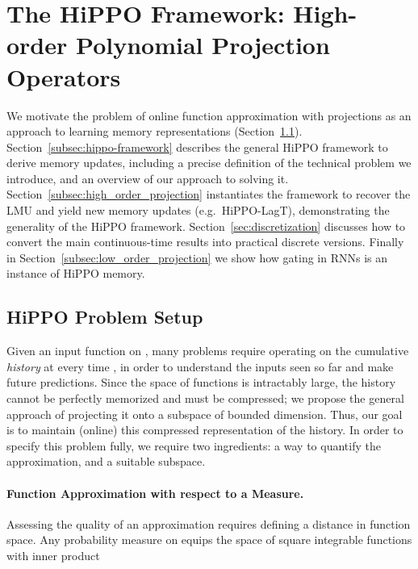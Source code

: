 \documentclass{article}
\begin{document}
 

\section{The HiPPO Framework: High-order Polynomial Projection Operators}
\label{sec:framework}

We motivate the problem of online function approximation with projections
as an approach to learning memory representations
(Section~\ref{subsec:hippo-setup}).
Section~\ref{subsec:hippo-framework} describes the general
HiPPO framework to derive memory updates, including a precise definition of the technical problem 
we introduce, and an overview of our approach to solving it.
Section~\ref{subsec:high_order_projection} instantiates the framework to recover
the LMU and yield new memory updates (e.g.\ HiPPO-LagT), demonstrating the generality
of the HiPPO framework.
Section~\ref{sec:discretization} discusses how to convert the main continuous-time results into practical discrete versions.
Finally in Section~\ref{subsec:low_order_projection} we show how gating
in RNNs is an instance of HiPPO memory.


\subsection{HiPPO Problem Setup}
\label{subsec:hippo-setup}





Given an input function  on , many problems require operating on the cumulative \emph{history}  at every time ,
in order to understand the inputs seen so far and make future predictions.
Since the space of functions is intractably large, the history cannot be perfectly memorized and must be compressed; we propose the general approach of projecting it onto a subspace of bounded dimension.
Thus, our goal is to maintain (online) this compressed representation of the history.
In order to specify this problem fully, we require two ingredients: a way to quantify the approximation, and a suitable subspace.


\paragraph{Function Approximation with respect to a Measure.}
Assessing the quality of an approximation requires defining a distance in function space.
Any probability measure  on  equips the space of square integrable functions with inner product
\end{document}
